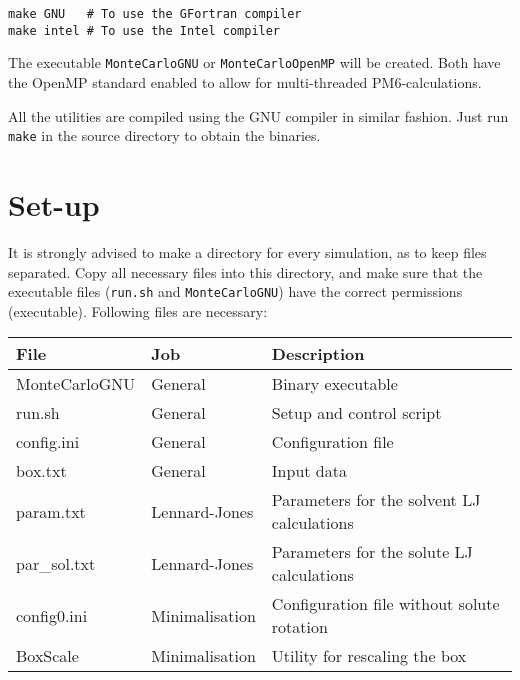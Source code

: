\begin{lstlisting}[caption=Compiling the main program]
make GNU   # To use the GFortran compiler
make intel # To use the Intel compiler
\end{lstlisting}

The executable \verb|MonteCarloGNU| or \verb|MonteCarloOpenMP| will be created.
Both have the OpenMP standard enabled to allow for multi-threaded 
PM6-calculations.

All the utilities are compiled using the GNU compiler in similar fashion.
Just run \verb|make| in the source directory to obtain the binaries.

\section{Set-up}
It is strongly advised to make a directory for every simulation, as to keep 
files separated. Copy all necessary files into this directory, and make sure 
that the executable files (\verb|run.sh| and \verb|MonteCarloGNU|) have the 
correct permissions (executable). Following files are necessary:

\begin{tabular}{lll}
	File & Job & Description \\ \hline \hline
	MonteCarloGNU & General & Binary executable \\
	run.sh & General & Setup and control script \\
	config.ini & General & Configuration file \\
	box.txt & General & Input data \\
	param.txt & Lennard-Jones & Parameters for the solvent LJ calculations \\
	par\_sol.txt & Lennard-Jones & Parameters for the solute LJ calculations \\
	config0.ini & Minimalisation & Configuration file without solute rotation \\
	BoxScale & Minimalisation & Utility for rescaling the box \\
\end{tabular}

